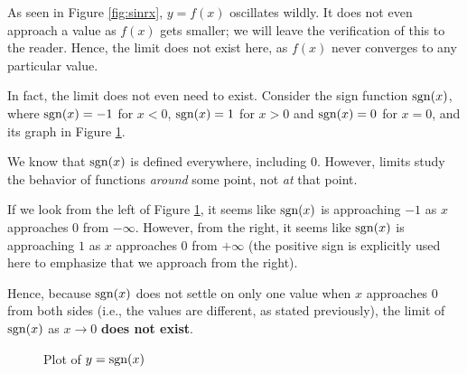 As seen in Figure \ref{fig:sinrx}, $y = f(x)$ oscillates wildly. It does not even approach a value as $f(x)$ gets smaller; we will leave
the verification of this to the reader. Hence, the limit does not exist here, as $f(x)$ never converges to any
particular value.

In fact, the limit does not even need to exist. Consider the sign function $\operatorname{sgn}(x)$, where
$\operatorname{sgn}(x) = -1$ for $x < 0$, $\operatorname{sgn}(x) = 1$ for $x > 0$ and $\operatorname{sgn}(x) = 0$ for $x = 0$, and its
graph in Figure \ref{fig:sgn}.

We know that $\operatorname{sgn}(x)$ is defined everywhere, including $0$. However, limits study the behavior of
functions \textit{around} some point, not \textit{at} that point.

If we look from the left of Figure \ref{fig:sgn}, it seems like $\operatorname{sgn}(x)$ is approaching $-1$ as $x$ approaches $0$ from
$-\infty$. However, from the right, it seems like $\operatorname{sgn}(x)$ is approaching $1$ as $x$ approaches $0$
from $+\infty$ (the positive sign is explicitly used here to emphasize that we approach from the right).

Hence, because $\operatorname{sgn}(x)$ does not settle on only one value when $x$ approaches $0$ from both sides
(i.e., the values are different, as stated previously), the limit of $\operatorname{sgn}(x)$ as $x \to 0$ \textbf{does
not exist}.

\begin{figure}[h]
    \centering
    \caption{Plot of $y = \operatorname{sgn}(x)$}
    \label{fig:sgn}
\end{figure}

